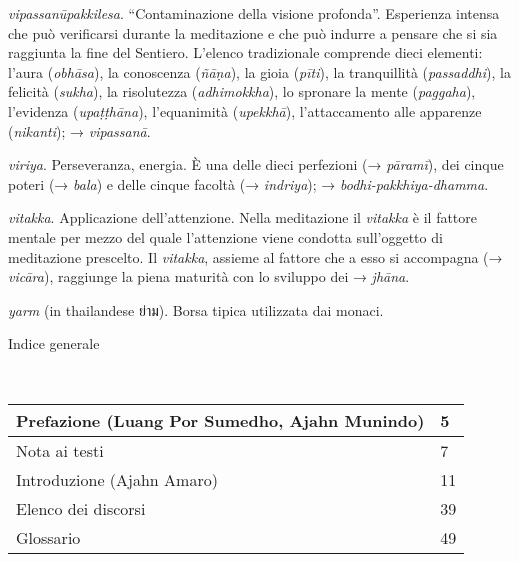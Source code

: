 \emph{vipassanūpakkilesa}. ``Contaminazione della visione profonda''.
Esperienza intensa che può verificarsi durante la meditazione e che può
indurre a pensare che si sia raggiunta la fine del Sentiero. L'elenco
tradizionale comprende dieci elementi: l'aura (\emph{obhāsa}), la
conoscenza (\emph{ñāṇa}), la gioia (\emph{pīti}), la tranquillità
(\emph{passaddhi}), la felicità (\emph{sukha}), la risolutezza
(\emph{adhimokkha}), lo spronare la mente (\emph{paggaha}), l'evidenza
(\emph{upaṭṭhāna}), l'equanimità (\emph{upekkhā}), l'attaccamento alle
apparenze (\emph{nikanti}); → \emph{vipassanā}.

\emph{viriya}. Perseveranza, energia. È una delle dieci perfezioni (→
\emph{pāramī}), dei cinque poteri (→ \emph{bala}) e delle cinque facoltà
(→ \emph{indriya}); → \emph{bodhi-pakkhiya-dhamma}.

\emph{vitakka}. Applicazione dell'attenzione. Nella meditazione il
\emph{vitakka} è il fattore mentale per mezzo del quale l'attenzione
viene condotta sull'oggetto di meditazione prescelto. Il \emph{vitakka},
assieme al fattore che a esso si accompagna (→ \emph{vicāra}), raggiunge
la piena maturità con lo sviluppo dei → \emph{jhāna}.

\emph{yarm} (in thailandese ย่าม). Borsa tipica utilizzata dai monaci.

Indice generale



\begin{longtable}[]{@{}ll@{}}
\toprule
Prefazione (Luang Por Sumedho, Ajahn Munindo) & 5\tabularnewline
\midrule
\endhead
Nota ai testi & 7\tabularnewline
Introduzione (Ajahn Amaro) & 11\tabularnewline
Elenco dei discorsi & 39\tabularnewline
Glossario & 49\tabularnewline
\bottomrule
\end{longtable}
